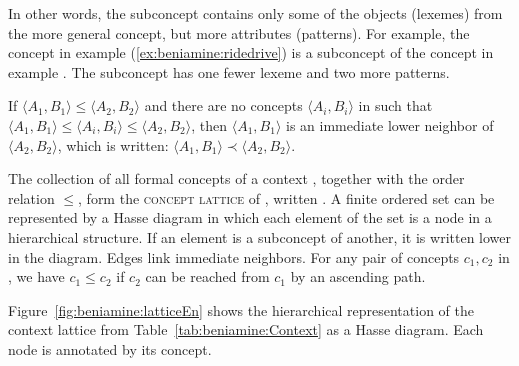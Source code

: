 \documentclass[output=paper]{langscibook}
\begin{document}
    In other words, the subconcept contains only some of the objects (lexemes) from the more general concept, but more attributes (patterns). For example, the concept in example (\ref{ex:beniamine:ridedrive}) is a subconcept of the concept in example . The subconcept has one fewer lexeme and two more patterns.

    If $\langle A_{1},B_{1} \rangle \leq \langle A_{2},B_{2} \rangle$ and there are no concepts $\langle A_{i},B_{i} \rangle$ in \context{} such that $\langle A_{1},B_{1} \rangle \leq \langle A_{i},B_{i} \rangle \leq \langle A_{2},B_{2} \rangle$, then $\langle A_{1},B_{1} \rangle$ is an immediate lower neighbor of $\langle A_{2},B_{2} \rangle$, which is written: $\langle A_{1},B_{1} \rangle \prec \langle A_{2},B_{2} \rangle$.

    The collection of all formal concepts of a context \context{}, together with the order relation $\leq$, form the \textsc{concept lattice} of \context{}, written \lattice{}\@. A finite ordered set can be represented by a Hasse diagram in which each element of the set is a node in a hierarchical structure. If an element is a subconcept of another, it is written lower in the diagram. Edges link immediate neighbors. For any pair of concepts  $c_{1}, c_{2}$ in \context{}, we have $c_{1} \leq c_{2}$ if $c_{2}$ can be reached from $c_{1}$ by an ascending path.

    Figure~\ref{fig:beniamine:latticeEn} shows the hierarchical representation of the context lattice from Table~\ref{tab:beniamine:Context} as a Hasse diagram. Each node is annotated by its concept.
\end{document}
